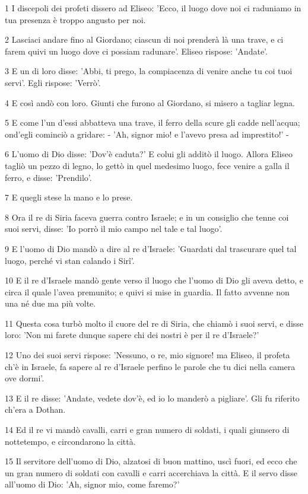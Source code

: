 \par 1 I discepoli dei profeti dissero ad Eliseo: 'Ecco, il luogo dove noi ci raduniamo in tua presenza è troppo angusto per noi.
\par 2 Lasciaci andare fino al Giordano; ciascun di noi prenderà là una trave, e ci farem quivi un luogo dove ci possiam radunare'. Eliseo rispose: 'Andate'.
\par 3 E un di loro disse: 'Abbi, ti prego, la compiacenza di venire anche tu coi tuoi servi'. Egli rispose: 'Verrò'.
\par 4 E così andò con loro. Giunti che furono al Giordano, si misero a tagliar legna.
\par 5 E come l'un d'essi abbatteva una trave, il ferro della scure gli cadde nell'acqua; ond'egli cominciò a gridare: - 'Ah, signor mio! e l'avevo presa ad imprestito!' -
\par 6 L'uomo di Dio disse: 'Dov'è caduta?' E colui gli additò il luogo. Allora Eliseo tagliò un pezzo di legno, lo gettò in quel medesimo luogo, fece venire a galla il ferro, e disse: 'Prendilo'.
\par 7 E quegli stese la mano e lo prese.
\par 8 Ora il re di Siria faceva guerra contro Israele; e in un consiglio che tenne coi suoi servi, disse: 'Io porrò il mio campo nel tale e tal luogo'.
\par 9 E l'uomo di Dio mandò a dire al re d'Israele: 'Guardati dal trascurare quel tal luogo, perché vi stan calando i Sirî'.
\par 10 E il re d'Israele mandò gente verso il luogo che l'uomo di Dio gli aveva detto, e circa il quale l'avea premunito; e quivi si mise in guardia. Il fatto avvenne non una né due ma più volte.
\par 11 Questa cosa turbò molto il cuore del re di Siria, che chiamò i suoi servi, e disse loro: 'Non mi farete dunque sapere chi dei nostri è per il re d'Israele?'
\par 12 Uno dei suoi servi rispose: 'Nessuno, o re, mio signore! ma Eliseo, il profeta ch'è in Israele, fa sapere al re d'Israele perfino le parole che tu dici nella camera ove dormi'.
\par 13 E il re disse: 'Andate, vedete dov'è, ed io lo manderò a pigliare'. Gli fu riferito ch'era a Dothan.
\par 14 Ed il re vi mandò cavalli, carri e gran numero di soldati, i quali giunsero di nottetempo, e circondarono la città.
\par 15 Il servitore dell'uomo di Dio, alzatosi di buon mattino, uscì fuori, ed ecco che un gran numero di soldati con cavalli e carri accerchiava la città. E il servo disse all'uomo di Dio: 'Ah, signor mio, come faremo?'

